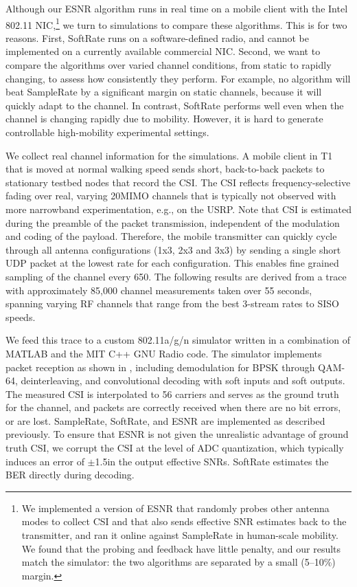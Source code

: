 Although our ESNR algorithm runs in real time on a mobile client with the Intel 802.11 NIC,\footnote{We implemented a version of ESNR that randomly probes other antenna modes to collect CSI and that also sends effective SNR estimates back to the transmitter, and ran it online against SampleRate in human-scale mobility. We found that the probing and feedback have little penalty, and our results match the simulator: the two algorithms are separated by a small (5--10\%) margin.} we turn to simulations to compare these algorithms. %
This is for two reasons. First, SoftRate runs on a software-defined radio, and cannot be implemented on a currently available commercial NIC\@. Second, we want to compare the algorithms over varied channel conditions, from static to rapidly changing, to assess how consistently they perform. 
For example, no algorithm will beat SampleRate by a significant margin on static channels, because it will quickly adapt to the channel. In contrast, SoftRate performs well even when the channel is changing rapidly due to mobility. However, it is hard to generate controllable high-mobility experimental settings. 



 We collect real channel information for the simulations. A mobile client in T1 that is moved at normal walking speed sends short, back-to-back packets to stationary testbed nodes that record the CSI\@. The CSI reflects frequency-selective fading over real, varying 20\MHz MIMO channels that is typically not observed with more narrowband experimentation, e.g., on the USRP\@. Note that CSI is estimated during the preamble of the packet transmission, independent of the modulation and coding of the payload. Therefore, the mobile transmitter can quickly cycle through all antenna configurations (1x3, 2x3 and 3x3) by sending a single short UDP packet at the lowest rate for each configuration. This enables fine grained sampling of the channel every 650\us. The following results are derived from a trace with approximately 85,000 channel measurements taken over 55 seconds, spanning varying RF channels that range from the best 3-stream rates to SISO speeds.

 We feed this trace to a custom 802.11a/g/n simulator written in a combination of MATLAB and the MIT C++ GNU Radio code. The simulator implements packet reception as shown in , including demodulation for BPSK through QAM-64, deinterleaving, and convolutional decoding with soft inputs and soft outputs. The measured CSI is interpolated to 56 carriers and serves as the ground truth for the channel, and packets are correctly received when there are no bit errors, or are lost. SampleRate, SoftRate, and ESNR are implemented as described previously. To ensure that ESNR is not given the unrealistic advantage of ground truth CSI, we corrupt the CSI at the level of ADC quantization, which typically induces an error of $\pm$1.5\dB in the output effective SNRs. SoftRate estimates the BER directly during decoding.


